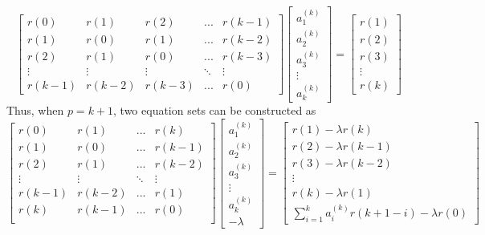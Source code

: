 \documentclass[preprint,12pt]{elsarticle}
\begin{document}
\begin{equation}
	\begin{bmatrix}
		r(0) & r(1) & r(2) & ... & r(k-1) \\ 
		r(1) & r(0) & r(1) & ... & r(k-2) \\
		r(2) & r(1) & r(0) & ... & r(k-3) \\
		\vdots & \vdots & \vdots & \ddots & \vdots \\
		r(k-1) & r(k-2) & r(k-3) & ... & r(0)
	\end{bmatrix}
	\begin{bmatrix}
		a_1^{(k)} \\ a_2^{(k)} \\ a_3^{(k)} \\ \vdots \\ a_k^{(k)}
	\end{bmatrix}
	=
	\begin{bmatrix}
		r(1) \\ r(2) \\ r(3) \\ \vdots \\ r(k)
	\end{bmatrix}
\end{equation}
Thus, when $p=k+1$, two equation sets can be constructed as
\begin{equation}
	\begin{bmatrix}
		r(0) & r(1) & ... & r(k)\\ 
		r(1) & r(0) & ... & r(k-1)\\
		r(2) & r(1) & ... & r(k-2)\\
		\vdots & \vdots & \ddots & \vdots \\
		r(k-1) & r(k-2) & ... & r(1)\\
		r(k) & r(k-1) & ... & r(0)\\
	\end{bmatrix}
	\begin{bmatrix}
		a_1^{(k)} \\ a_2^{(k)} \\ a_3^{(k)} \\ \vdots \\ a_k^{(k)} \\ -\lambda
	\end{bmatrix}
	=
	\begin{bmatrix}
		r(1) - \lambda r(k) \\
		r(2) - \lambda r(k-1) \\
		r(3) - \lambda r(k-2) \\
		\vdots \\
		r(k) - \lambda r(1) \\
		\sum_{i=1}^{k}a_i^{(k)} r(k+1-i)-\lambda r(0)
	\end{bmatrix}
\end{equation}
\end{document}
